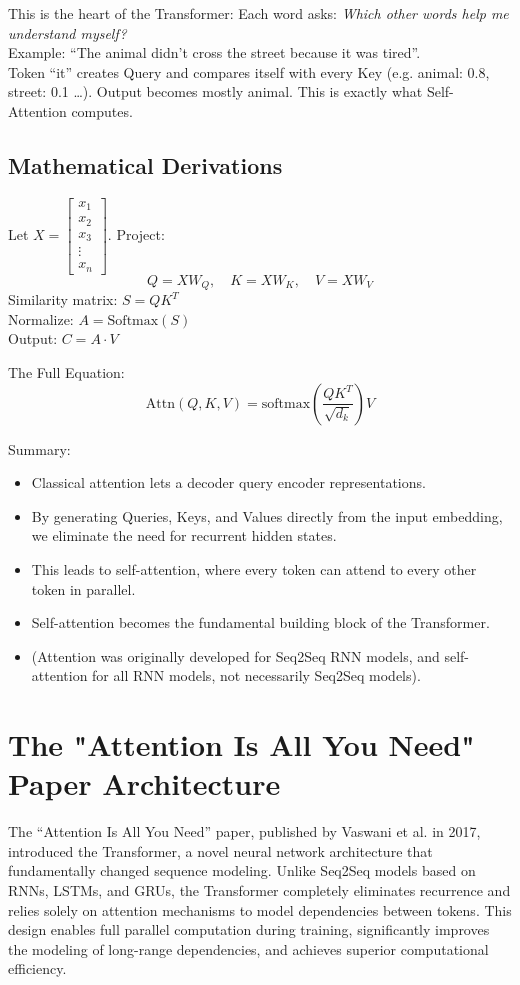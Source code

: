 This is the heart of the Transformer: Each word asks: \textit{Which other words help me understand myself?} \\
Example: “The animal didn't cross the street because it was tired”. \\
Token “it” creates Query and compares itself with every Key (e.g. animal: 0.8, street: 0.1 \dots). Output becomes mostly animal. This is exactly what Self-Attention computes.

\subsection{Mathematical Derivations}
Let $X = \begin{bmatrix} x_1 \\ x_2 \\ x_3 \\ \vdots \\ x_n \end{bmatrix}$. Project:
\begin{equation}
Q = X W_Q, \quad K = X W_K, \quad V = X W_V
\end{equation}
Similarity matrix: $S = Q K^T$ \\
Normalize: $A = \text{Softmax}(S)$ \\
Output: $C = A \cdot V$

The Full Equation:
\begin{equation}
\text{Attn}(Q, K, V) = \text{softmax}\left(\frac{Q K^T}{\sqrt{d_k}}\right) V
\end{equation}

Summary:
\begin{itemize}
    \item Classical attention lets a decoder query encoder representations.
    \item By generating Queries, Keys, and Values directly from the input embedding, we eliminate the need for recurrent hidden states.
    \item This leads to self-attention, where every token can attend to every other token in parallel.
    \item Self-attention becomes the fundamental building block of the Transformer.
    \item (Attention was originally developed for Seq2Seq RNN models, and self-attention for all RNN models, not necessarily Seq2Seq models).
\end{itemize}

\section{The "Attention Is All You Need" Paper Architecture}
The “Attention Is All You Need” paper, published by Vaswani et al. in 2017, introduced the Transformer, a novel neural network architecture that fundamentally changed sequence modeling. Unlike Seq2Seq models based on RNNs, LSTMs, and GRUs, the Transformer completely eliminates recurrence and relies solely on attention mechanisms to model dependencies between tokens. This design enables full parallel computation during training, significantly improves the modeling of long-range dependencies, and achieves superior computational efficiency.

